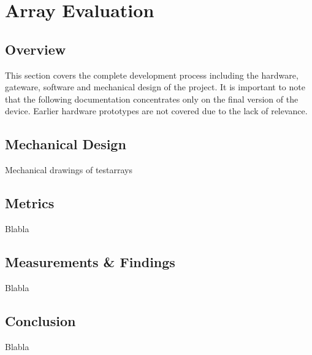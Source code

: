\chapter{Array Evaluation}
\section{Overview}
This section covers the complete development process including the hardware, gateware, software and mechanical design of the project. It is important to note that the following documentation concentrates only on the final version of the device. Earlier hardware prototypes are not covered due to the lack of relevance.

\newpage
\section{Mechanical Design}
Mechanical drawings of testarrays

\newpage
\section{Metrics}
Blabla

\newpage
\section{Measurements \& Findings}
Blabla


\newpage
\section{Conclusion}
Blabla
